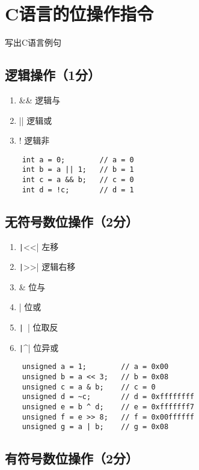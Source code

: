 \section{C语言的位操作指令}
\begin{center}
    写出C语言例句
\end{center}

\subsection{逻辑操作（1分）}

\begin{enumerate}
    \item \&\& 逻辑与
    \item ||   逻辑或
    \item !    逻辑非
\end{enumerate}

\begin{verbatim}
    int a = 0;        // a = 0
    int b = a || 1;   // b = 1
    int c = a && b;   // c = 0
    int d = !c;       // d = 1
\end{verbatim}

\subsection{无符号数位操作（2分）}

\begin{enumerate}
    \item \texttt|<<| 左移
    \item \texttt|>>| 逻辑右移
    \item \& 位与
    \item | 位或
    \item \texttt|~| 位取反
    \item \texttt|^| 位异或
\end{enumerate}

\begin{verbatim}
    unsigned a = 1;        // a = 0x00
    unsigned b = a << 3;   // b = 0x08
    unsigned c = a & b;    // c = 0
    unsigned d = ~c;       // d = 0xffffffff
    unsigned e = b ^ d;    // e = 0xfffffff7
    unsigned f = e >> 8;   // f = 0x00ffffff
    unsigned g = a | b;    // g = 0x08
\end{verbatim}

\subsection{有符号数位操作（2分）}

